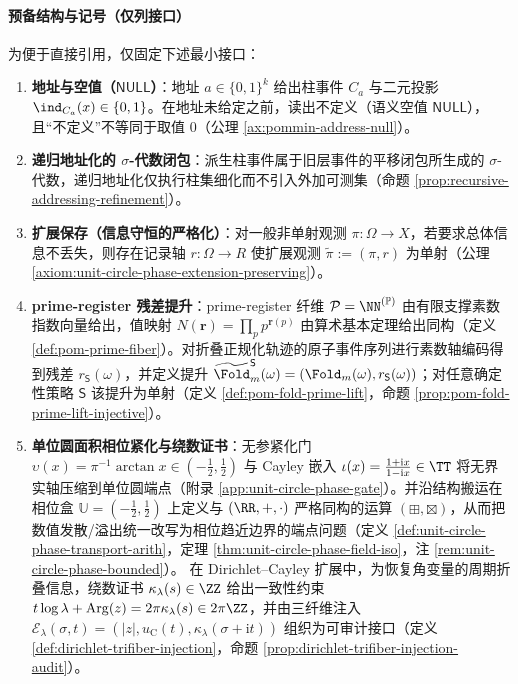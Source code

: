 \paragraph{预备结构与记号（仅列接口）}
为便于直接引用，仅固定下述最小接口：
\begin{enumerate}
  \item \textbf{地址与空值（\(\mathsf{NULL}\)）}：地址 \(a\in\{0,1\}^k\) 给出柱事件 \(C_a\) 与二元投影 \(\ind_{C_a}(x)\in\{0,1\}\)。在地址未给定之前，读出不定义（语义空值 \(\mathsf{NULL}\)），且“不定义”不等同于取值 \(0\)（公理 \ref{ax:pommin-address-null}）。
  \item \textbf{递归地址化的 \(\sigma\)-代数闭包}：派生柱事件属于旧层事件的平移闭包所生成的 \(\sigma\)-代数，递归地址化仅执行柱集细化而不引入外加可测集（命题 \ref{prop:recursive-addressing-refinement}）。
  \item \textbf{扩展保存（信息守恒的严格化）}：对一般非单射观测 \(\pi:\Omega\to X\)，若要求总体信息不丢失，则存在记录轴 \(r:\Omega\to R\) 使扩展观测 \(\widetilde\pi:=(\pi,r)\) 为单射（公理 \ref{axiom:unit-circle-phase-extension-preserving}）。
  \item \textbf{prime-register 残差提升}：prime-register 纤维 \(\mathcal{P}=\NN^{(\mathbb{P})}\) 由有限支撑素数指数向量给出，值映射 \(N(\mathbf r)=\prod_{p}p^{\mathbf r(p)}\) 由算术基本定理给出同构（定义 \ref{def:pom-prime-fiber}）。对折叠正规化轨迹的原子事件序列进行素数轴编码得到残差 \(r_{\mathsf S}(\omega)\)，并定义提升 \(\widetilde{\Fold}_m^{\mathsf S}(\omega)=(\Fold_m(\omega),r_{\mathsf S}(\omega))\)；对任意确定性策略 \(\mathsf S\) 该提升为单射（定义 \ref{def:pom-fold-prime-lift}，命题 \ref{prop:pom-fold-prime-lift-injective}）。
  \item \textbf{单位圆面积相位紧化与绕数证书}：无参紧化门 \(\upsilon(x)=\pi^{-1}\arctan x\in(-\tfrac12,\tfrac12)\) 与 Cayley 嵌入 \(\iota(x)=\frac{1+\mathrm{i}x}{1-\mathrm{i}x}\in\TT\) 将无界实轴压缩到单位圆端点（附录 \ref{app:unit-circle-phase-gate}）。并沿结构搬运在相位盒 \(\mathbb{U}=(-\tfrac12,\tfrac12)\) 上定义与 \((\RR,+,\cdot)\) 严格同构的运算 \((\boxplus,\boxtimes)\)，从而把数值发散/溢出统一改写为相位趋近边界的端点问题（定义 \ref{def:unit-circle-phase-transport-arith}，定理 \ref{thm:unit-circle-phase-field-iso}，注 \ref{rem:unit-circle-phase-bounded}）。
  在 Dirichlet--Cayley 扩展中，为恢复角变量的周期折叠信息，绕数证书 \(\kappa_\lambda(s)\in\ZZ\) 给出一致性约束 \(t\log\lambda+\mathrm{Arg}(z)=2\pi\kappa_\lambda(s)\in 2\pi\ZZ\)，并由三纤维注入 \(\mathcal{E}_\lambda(\sigma,t)=(|z|,u_{\mathrm C}(t),\kappa_\lambda(\sigma+\mathrm{i}t))\) 组织为可审计接口（定义 \ref{def:dirichlet-trifiber-injection}，命题 \ref{prop:dirichlet-trifiber-injection-audit}）。
\end{enumerate}

